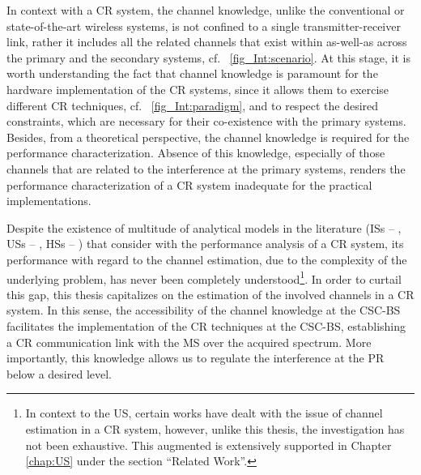 In context with a CR system, the channel knowledge, unlike the conventional or state-of-the-art wireless systems, is not confined to a single transmitter-receiver link, rather it includes all the related channels that exist within as-well-as across the primary and the secondary systems, cf. \figurename~\ref{fig_Int:scenario}. At this stage, it is worth understanding the fact that channel knowledge is paramount for the hardware implementation of the CR systems, since it allows them to exercise different CR techniques, cf. \figurename~\ref{fig_Int:paradigm}, and to respect the desired constraints, which are necessary for their co-existence with the primary systems. Besides, from a theoretical perspective, the channel knowledge is required for the performance characterization. Absence of this knowledge, especially of those channels that are related to the interference at the primary systems, renders the performance characterization of a CR system inadequate for the practical implementations. 

Despite the existence of multitude of analytical models in the literature (ISs -- \cite{Liang08, Sharma14, Pradhan15}, USs -- \cite{Xing07, Ghasemi07, Kang09}, HSs -- \cite{Song13, Gmira15, Jiang13, Fili15}) that consider with the performance analysis of a CR system, its performance with regard to the channel estimation, due to the complexity of the underlying problem, has never been completely understood\footnote{In context to the US, certain works \cite{Musa09, Suraweera10, Kim12} have dealt with the issue of channel estimation in a CR system, however, unlike this thesis, the investigation has not been exhaustive. This augmented is extensively supported in Chapter \ref{chap:US} under the section ``Related Work''.}. In order to curtail this gap, this thesis capitalizes on the estimation of the involved channels in a CR system. In this sense, the accessibility of the channel knowledge at the CSC-BS facilitates the implementation of the CR techniques at the CSC-BS, establishing a CR communication link with the MS over the acquired spectrum. More importantly, this knowledge allows us to regulate the interference at the PR below a desired level. 

